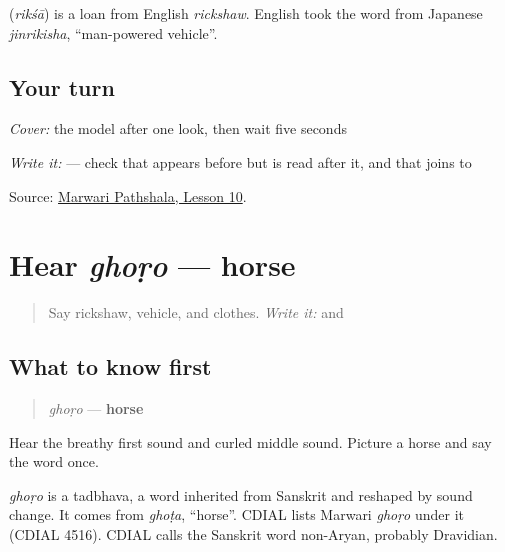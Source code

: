\begin{cousinweb}
\textbf{} (\emph{rikśā}) is a loan from English \emph{rickshaw}. English took the word from Japanese \emph{jinrikisha}, \textquotedblleft{}man-powered vehicle\textquotedblright{}.
\end{cousinweb}

\subsection*{Your turn}
\emph{Cover:} the model after one look, then wait five seconds

\emph{Write it:} \textbf{} — check that \textbf{} appears before \textbf{} but is read after it, and that \textbf{} joins \textbf{} to \textbf{}

\begin{tcolorbox}[breakable,colback=teal!4,colframe=teal!35!black,title={Before you move on}]
Source: \href{https://www.marwaripathshala.com/marwari-lesson-10-english}{Marwari Pathshala, Lesson 10}.
\end{tcolorbox}
\section[ghoṛo]{Hear \emph{ghoṛo} — horse}

\label{lesson:MW-C17-hear-ghodo}



\begin{quote}
Say rickshaw, vehicle, and clothes. \emph{Write it:} \textbf{} and \textbf{}
\end{quote}

\subsection*{What to know first}
\begin{quote}
\emph{ghoṛo} — \textbf{horse}
\end{quote}

Hear the breathy first sound and curled middle sound. Picture a horse and say the word once.

\begin{cousinweb}
\emph{ghoṛo} is a tadbhava, a word inherited from Sanskrit and reshaped by sound change. It comes from \emph{ghoṭa}, \textquotedblleft{}horse\textquotedblright{}. CDIAL lists Marwari \emph{ghoṛo} under it (CDIAL 4516). CDIAL calls the Sanskrit word non-Aryan, probably Dravidian.
\end{cousinweb}

